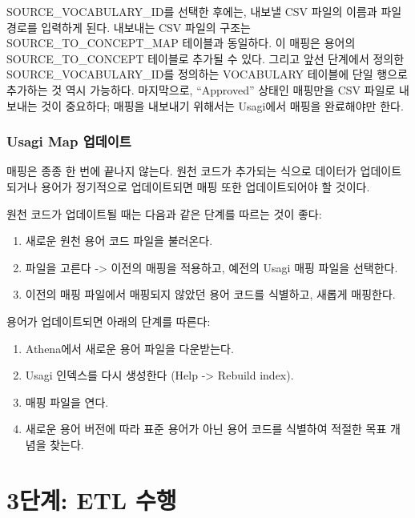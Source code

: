 \documentclass[10.5pt]{book}
\providecommand{\tightlist}{%
  \setlength{\itemsep}{0pt}\setlength{\parskip}{0pt}}
\theoremstyle{definition}
\theoremstyle{definition}
\theoremstyle{definition}
\theoremstyle{remark}
\begin{document}
SOURCE\_VOCABULARY\_ID를 선택한 후에는, 내보낼 CSV 파일의 이름과 파일
경로를 입력하게 된다. 내보내는 CSV 파일의 구조는
SOURCE\_TO\_CONCEPT\_MAP 테이블과 동일하다. 이 매핑은 용어의
SOURCE\_TO\_CONCEPT 테이블로 추가될 수 있다. 그리고 앞선 단계에서 정의한
SOURCE\_VOCABULARY\_ID를 정의하는 VOCABULARY 테이블에 단일 행으로
추가하는 것 역시 가능하다. 마지막으로, ``Approved'' 상태인 매핑만을 CSV
파일로 내보내는 것이 중요하다; 매핑을 내보내기 위해서는 Usagi에서 매핑을
완료해야만 한다.

\subsubsection*{Usagi Map 업데이트}\label{usagi-map-}

매핑은 종종 한 번에 끝나지 않는다. 원천 코드가 추가되는 식으로 데이터가
업데이트되거나 용어가 정기적으로 업데이트되면 매핑 또한 업데이트되어야
할 것이다.

원천 코드가 업데이트될 때는 다음과 같은 단계를 따르는 것이 좋다:

\begin{enumerate}
\def\labelenumi{\arabic{enumi}.}
\tightlist
\item
  새로운 원천 용어 코드 파일을 불러온다.
\item
  파일을 고른다 -\textgreater{} 이전의 매핑을 적용하고, 예전의 Usagi
  매핑 파일을 선택한다.
\item
  이전의 매핑 파일에서 매핑되지 않았던 용어 코드를 식별하고, 새롭게
  매핑한다.
\end{enumerate}

용어가 업데이트되면 아래의 단계를 따른다:

\begin{enumerate}
\def\labelenumi{\arabic{enumi}.}
\tightlist
\item
  Athena에서 새로운 용어 파일을 다운받는다.
\item
  Usagi 인덱스를 다시 생성한다 (Help -\textgreater{} Rebuild index).
\item
  매핑 파일을 연다.
\item
  새로운 용어 버전에 따라 표준 용어가 아닌 용어 코드를 식별하여 적절한
  목표 개념을 찾는다.
\end{enumerate}

\section{3단계: ETL 수행}\label{-etl-}
\end{document}
